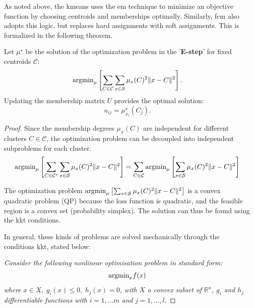\begin{remark}
	\begin{toReview}
	As noted above, the \gls{kmeans} uses the \gls{em} technique to minimize an objective function by choosing centroids and memberships optimally. Similarly, \gls{fcm} also adopts this logic, but replaces hard assignments with soft assignments. This is formalized in the following theorem.
	\begin{theorem} \label{thm:Eupdate}
		Let \(\mu^\star\) be the solution of the optimization problem in the '\textbf{E-step}' for fixed centroids \(\mathcal{C}\):
		\[
		\textnormal{argmin}_{\mu}\left[\sum_{C\in\mathcal{C}}\sum_{x \in \mathcal{S}}\mu_x(C)^2\|x-C\|^2\right].
		\]
		Updating the membership matrix \(U\) provides the optimal solution:
		\[
		u_{ij} = \mu^\star_{x_i}(C_j).
		\]
	\end{theorem}
	\begin{proof}
		Since the membership degrees $\mu_x(C)$ are independent for different clusters $C\in \mathcal{C}$, the optimization problem can be decoupled into independent subproblems for each cluster.
		$$\textnormal{argmin}_{ \mu}\left[\sum_{C\in\mathcal{C}^\star}\sum_{x \in \mathcal{S}}\mu_x(C)^2\|x-C\|^2\right] = \sum_{C\in\mathcal{C}}\textnormal{argmin}_{ \mu}\left[\sum_{x \in \mathcal{S}}\mu_x(C)^2\|x-C\|^2\right]$$

		\noindent The optimization problem $\textnormal{argmin}_{\mu}\left[\sum_{x \in \mathcal{S}}\mu_x(C)^2\|x-C\|^2\right]$ is a convex quadratic problem (QP) because the loss function is quadratic, and the feasible region is a convex set (probability simplex). The solution can thus be found using the \gls{kkt} conditions.

		\bigskip \noindent In general, these kinds of problems are solved mechanically through the conditions \gls{kkt}, stated below:

		\itshape\noindent Consider the following nonlinear optimisation problem in standard form:
		$$\textnormal{argmin}_x f(x)$$
		where $x\in X,\; g_i(x)\leq0,\; h_j(x)=0$, with $X$ a convex subset of $\mathbb{R}^n$, $g_i$ and $h_j$ differentiable functions with $i=1,\ldots m$ and $j=1,\ldots,l$.


\end{proof}
\end{toReview}
\end{remark}
